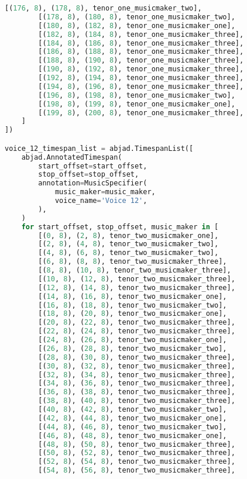 \begin{lstlisting}[language=Python, caption=Invocation Source Code]
        [(176, 8), (178, 8), tenor_one_musicmaker_two],
        [(178, 8), (180, 8), tenor_one_musicmaker_two],
        [(180, 8), (182, 8), tenor_one_musicmaker_one],
        [(182, 8), (184, 8), tenor_one_musicmaker_three],
        [(184, 8), (186, 8), tenor_one_musicmaker_three],
        [(186, 8), (188, 8), tenor_one_musicmaker_three],
        [(188, 8), (190, 8), tenor_one_musicmaker_three],
        [(190, 8), (192, 8), tenor_one_musicmaker_three],
        [(192, 8), (194, 8), tenor_one_musicmaker_three],
        [(194, 8), (196, 8), tenor_one_musicmaker_three],
        [(196, 8), (198, 8), tenor_one_musicmaker_two],
        [(198, 8), (199, 8), tenor_one_musicmaker_one],
        [(199, 8), (200, 8), tenor_one_musicmaker_three],
    ]
])

voice_12_timespan_list = abjad.TimespanList([
    abjad.AnnotatedTimespan(
        start_offset=start_offset,
        stop_offset=stop_offset,
        annotation=MusicSpecifier(
            music_maker=music_maker,
            voice_name='Voice 12',
        ),
    )
    for start_offset, stop_offset, music_maker in [
        [(0, 8), (2, 8), tenor_two_musicmaker_one],
        [(2, 8), (4, 8), tenor_two_musicmaker_two],
        [(4, 8), (6, 8), tenor_two_musicmaker_two],
        [(6, 8), (8, 8), tenor_two_musicmaker_three],
        [(8, 8), (10, 8), tenor_two_musicmaker_three],
        [(10, 8), (12, 8), tenor_two_musicmaker_three],
        [(12, 8), (14, 8), tenor_two_musicmaker_three],
        [(14, 8), (16, 8), tenor_two_musicmaker_one],
        [(16, 8), (18, 8), tenor_two_musicmaker_two],
        [(18, 8), (20, 8), tenor_two_musicmaker_one],
        [(20, 8), (22, 8), tenor_two_musicmaker_three],
        [(22, 8), (24, 8), tenor_two_musicmaker_three],
        [(24, 8), (26, 8), tenor_two_musicmaker_one],
        [(26, 8), (28, 8), tenor_two_musicmaker_two],
        [(28, 8), (30, 8), tenor_two_musicmaker_three],
        [(30, 8), (32, 8), tenor_two_musicmaker_three],
        [(32, 8), (34, 8), tenor_two_musicmaker_three],
        [(34, 8), (36, 8), tenor_two_musicmaker_three],
        [(36, 8), (38, 8), tenor_two_musicmaker_three],
        [(38, 8), (40, 8), tenor_two_musicmaker_three],
        [(40, 8), (42, 8), tenor_two_musicmaker_two],
        [(42, 8), (44, 8), tenor_two_musicmaker_one],
        [(44, 8), (46, 8), tenor_two_musicmaker_two],
        [(46, 8), (48, 8), tenor_two_musicmaker_one],
        [(48, 8), (50, 8), tenor_two_musicmaker_three],
        [(50, 8), (52, 8), tenor_two_musicmaker_three],
        [(52, 8), (54, 8), tenor_two_musicmaker_three],
        [(54, 8), (56, 8), tenor_two_musicmaker_three],

\end{lstlisting}
